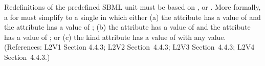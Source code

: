 Redefinitions of the predefined SBML unit  must be
based on ,  or .  More
formally, a \UnitDefinition for  must simplify to a single
\Unit in which either (a) the  attribute has
a value of  and the  attribute has a value of
; (b) the  attribute has a value of
 and the  attribute has a value of ; or
(c) the kind attribute has a value of  with
any  value.  (References: L2V1 Section 4.4.3; L2V2
Section~4.4.3; L2V3 Section~4.4.3; L2V4 Section~4.4.3.)
